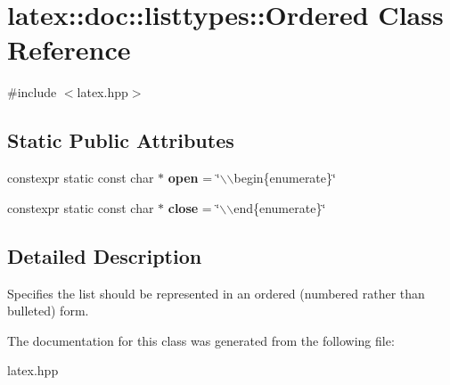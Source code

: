 \hypertarget{classlatex_1_1doc_1_1listtypes_1_1Ordered}{\section{latex\-:\-:doc\-:\-:listtypes\-:\-:\-Ordered \-Class \-Reference}
\label{classlatex_1_1doc_1_1listtypes_1_1Ordered}
}


{\ttfamily \#include $<$latex.\-hpp$>$}

\subsection*{\-Static \-Public \-Attributes}
\begin{DoxyCompactItemize}
\item 
\hypertarget{classlatex_1_1doc_1_1listtypes_1_1Ordered_abe82c02d83ba66d14e5b0f0301aefd36}{constexpr static const char $\ast$ {\bfseries open} = \char`\"{}$\backslash$$\backslash$begin\{enumerate\}\char`\"{}}\label{classlatex_1_1doc_1_1listtypes_1_1Ordered_abe82c02d83ba66d14e5b0f0301aefd36}

\item 
\hypertarget{classlatex_1_1doc_1_1listtypes_1_1Ordered_af9bb481a3ac6257629c086fee6124384}{constexpr static const char $\ast$ {\bfseries close} = \char`\"{}$\backslash$$\backslash$end\{enumerate\}\char`\"{}}\label{classlatex_1_1doc_1_1listtypes_1_1Ordered_af9bb481a3ac6257629c086fee6124384}

\end{DoxyCompactItemize}


\subsection{\-Detailed \-Description}
\-Specifies the list should be represented in an ordered (numbered rather than bulleted) form. 

\-The documentation for this class was generated from the following file\-:\begin{DoxyCompactItemize}
\item 
latex.\-hpp\end{DoxyCompactItemize}

